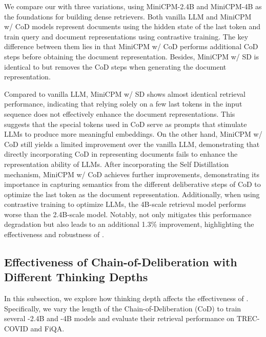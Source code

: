 We compare our \method{} with three variations, using MiniCPM-2.4B and MiniCPM-4B as the foundations for building dense retrievers. Both vanilla LLM and MiniCPM w/ CoD models represent documents using the hidden state of the last token and train query and document representations using contrastive training. The key difference between them lies in that MiniCPM w/ CoD performs additional CoD steps before obtaining the document representation. Besides, MiniCPM w/ SD is identical to \method{} but removes the CoD steps when generating the document representation.

Compared to vanilla LLM, MiniCPM w/ SD shows almost identical retrieval performance, indicating that relying solely on a few last tokens in the input sequence does not effectively enhance the document representations. This suggests that the special tokens used in CoD serve as prompts that stimulate LLMs to produce more meaningful embeddings.
On the other hand, MiniCPM w/ CoD still yields a limited improvement over the vanilla LLM, demonstrating that directly incorporating CoD in representing documents fails to enhance the representation ability of LLMs. After incorporating the Self Distillation mechanism, MiniCPM w/ CoD achieves further improvements, demonstrating its importance in capturing semantics from the different deliberative steps of CoD to optimize the last token as the document representation.
Additionally, when using contrastive training to optimize LLMs, the 4B-scale retrieval model performs worse than the 2.4B-scale model. Notably, \method{} not only mitigates this performance degradation but also leads to an additional 1.3\% improvement, highlighting the effectiveness and robustness of \method{}.


\subsection{Effectiveness of Chain-of-Deliberation with Different Thinking Depths}
\label{5_3_cod}
In this subsection, we explore how thinking depth affects the effectiveness of \method{}. Specifically, we vary the length of the Chain-of-Deliberation (CoD) to train several \method{}-2.4B and \method{}-4B models and evaluate their retrieval performance on TREC-COVID and FiQA. 

